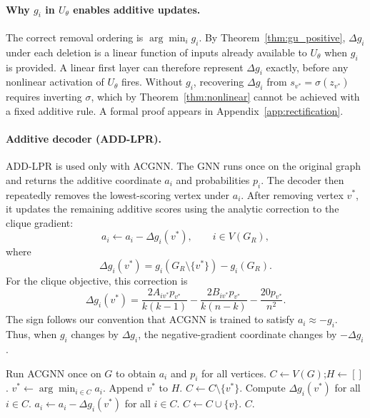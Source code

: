 \documentclass[11pt]{article}
\newcommand{\change}[1]{{\color{red}#1}}
\theoremstyle{plain}
\theoremstyle{definition}
\theoremstyle{remark}
\begin{document}
\change{\paragraph{Why $g_i$ in $U_\theta$ enables additive updates.}
  The correct removal ordering is $\arg\min_i g_i$. By
  Theorem~\ref{thm:gu_positive}, $\Delta g_i$ under each deletion is a linear function
  of inputs already available to $U_\theta$ when $g_i$ is provided. A linear first
  layer can therefore represent $\Delta g_i$ exactly, before any nonlinear activation
  of $U_\theta$ fires. Without $g_i$, recovering $\Delta g_i$ from $s_{v^*}=\sigma(z_{v^*})$
  requires inverting $\sigma$, which by Theorem~\ref{thm:nonlinear} cannot be achieved
with a fixed additive rule. A formal proof appears in Appendix~\ref{app:rectification}.}

\paragraph{Additive decoder (ADD-LPR).}
ADD-LPR is used only with ACGNN. The GNN runs once on the original graph and returns
the additive coordinate $a_i$ and probabilities $p_i$. The decoder then repeatedly
removes the lowest-scoring vertex under $a_i$. After removing vertex $v^*$, it updates
the remaining additive scores using the analytic correction to the clique gradient:
\begin{equation}
  a_i
  \leftarrow
  a_i-\Delta g_i(v^*),
  \qquad i\in V(G_R),
  \label{eq:additive_update}
\end{equation}
where
\[
  \Delta g_i(v^*)
  =
  g_i(G_R\setminus\{v^*\})-g_i(G_R).
\]
For the clique objective, this correction is
\[
  \Delta g_i(v^*)
  =
  \frac{2A_{iv^*}p_{v^*}}{k(k-1)}
  -
  \frac{2B_{iv^*}p_{v^*}}{k(n-k)}
  -
  \frac{20p_{v^*}}{n^2}.
\]
The sign follows our convention that ACGNN is trained to satisfy $a_i\approx -g_i$.
Thus, when $g_i$ changes by $\Delta g_i$, the negative-gradient coordinate changes by
$-\Delta g_i$.

\begin{algorithm}[t]
  \caption{Additive Decoder (ADD-LPR)}
  \label{alg:add_lpr}
  \begin{algorithmic}[1]
    \State Run ACGNN once on $G$ to obtain $a_i$ and $p_i$ for all vertices.
    \State $C\leftarrow V(G)$;\quad $H\leftarrow []$.
    \State $v^*\leftarrow \arg\min_{i\in C} a_i$.
    \State Append $v^*$ to $H$.
    \State $C\leftarrow C\setminus\{v^*\}$.
    \State Compute $\Delta g_i(v^*)$ for all $i\in C$.
    \State $a_i\leftarrow a_i-\Delta g_i(v^*)$ for all $i\in C$.
    \EndWhile
    \State $C\leftarrow C\cup\{v\}$.
    \EndIf
    \EndFor
    \State \Return $C$.
  \end{algorithmic}
\end{algorithm}
\end{document}
